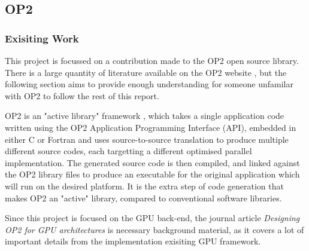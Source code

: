 \subsection{OP2}

\subsubsection{Exisiting Work}

This project is focussed on a contribution made to the OP2 open source library. There is a large quantity of literature available on the OP2 website \cite{op-dsl}, but the following section aims to provide enough understanding for someone unfamilar with OP2 to follow the rest of this report.
\par
OP2 is an "active library" framework \cite{op2main}, which takes a single application code written using the OP2 Application Programming Interface (API), embedded in either C or Fortran and uses source-to-source translation to produce multiple different source codes, each targetting a different optimised parallel implementation. The generated source code is then compiled, and linked against the OP2 library files to produce an executable for the original application which will run on the desired platform. It is the extra step of code generation that makes OP2 an "active" library, compared to conventional software libraries.
\par
Since this project is focused on the GPU back-end, the journal article \textit{Designing OP2 for GPU architectures} \cite{gpudesign} is necessary background material, as it covers a lot of important details from the implementation exisiting GPU framework.

